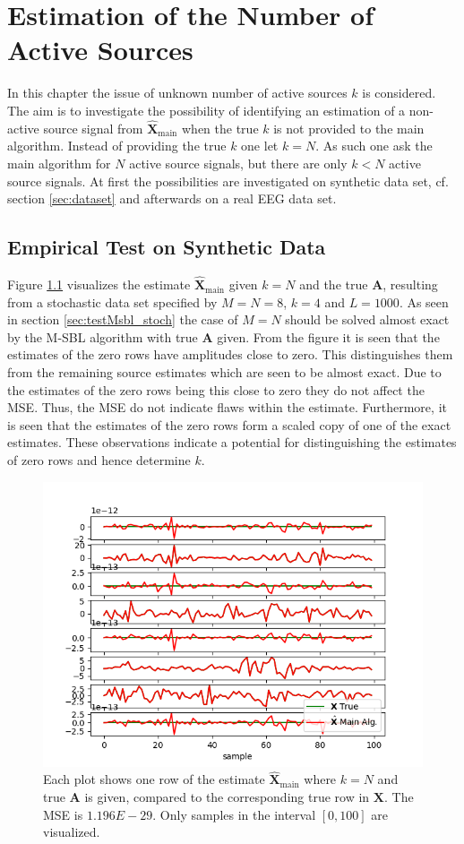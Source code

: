 \chapter{Estimation of the Number of Active Sources}\label{ch:estimation_k}
In this chapter the issue of unknown number of active sources $k$ is considered. 
The aim is to investigate the possibility of identifying an estimation of a non-active source signal from $\hat{\textbf{X}}_{\text{main}}$ when the true $k$ is not provided to the main algorithm. 
Instead of providing the true $k$ one let $k = N$.
As such one ask the main algorithm for $N$ active source signals, but there are only $k < N$ active source signals. 
At first the possibilities are investigated on synthetic data set, cf. section \ref{sec:dataset} and afterwards on a real EEG data set.   

\section{Empirical Test on Synthetic Data}
Figure \ref{fig:ktest1} visualizes the estimate $\hat{\mathbf{X}}_{\text{main}}$ given $k=N$ and the true $\textbf{A}$, resulting from a stochastic data set specified by $M = N = 8$, $k = 4$ and $L = 1000$. 
As seen in section \ref{sec:testMsbl_stoch} the case of $M = N$ should be solved almost exact by the M-SBL algorithm with true $\mathbf{A}$ given. 
From the figure it is seen that the estimates of the zero rows have amplitudes close to zero.
This distinguishes them from the remaining source estimates which are seen to be almost exact. 
Due to the estimates of the zero rows being this close to zero they do not affect the MSE. 
Thus, the MSE do not indicate flaws within the estimate. 
Furthermore, it is seen that the estimates of the zero rows form a scaled copy of one of the exact estimates. 
These observations indicate a potential for distinguishing the estimates of zero rows and hence determine $k$.     
\begin{figure}[H]
    \centering
	\includegraphics[scale=0.5]{figures/ch_estimate/k_test1.png}
	\caption{Each plot shows one row of the estimate $\hat{\mathbf{X}}_{\text{main}}$ where $k=N$ and true $\mathbf{A}$ is given, compared to the corresponding true row in $\mathbf{X}$. The MSE is $1.196E-29$. Only samples in the interval $[0,100]$ are visualized.}
	\label{fig:ktest1}
\end{figure}
